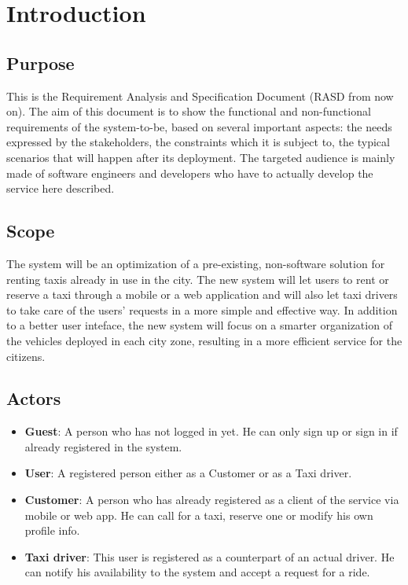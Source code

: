 \section{Introduction}

\subsection{Purpose}
This is the Requirement Analysis and Specification Document (RASD from now on). The aim of this document is to show the functional and non-functional requirements of the system-to-be, based on several important aspects: the needs expressed by the stakeholders, the constraints which it is subject to, the typical scenarios that will happen after its deployment. The targeted audience is mainly made of software engineers and developers who have to actually develop the service here described.

\subsection{Scope}
The system will be an optimization of a pre-existing, non-software solution for renting taxis already in use in the city. The new system will let users to rent or reserve a taxi through a mobile or a web application and will also let taxi drivers to take care of the users' requests in a more simple and effective way. In addition to a better user inteface, the new system will focus on a smarter organization of the vehicles deployed in each city zone, resulting in a more efficient service for the citizens.

\subsection{Actors}
\begin{itemize}
	\item \textbf{Guest}: A person who has not logged in yet. He can only sign up or sign in if already registered in the system.
	\item \textbf{User}: A registered person either as a Customer or as a Taxi driver.
	\item \textbf{Customer}: A person who has already registered as a client of the service via mobile or web app. He can call for a taxi, reserve one or modify his own profile info.
	\item \textbf{Taxi driver}: This user is registered as a counterpart of an actual driver. He can notify his availability to the system and accept a request for a ride.
\end{itemize}

